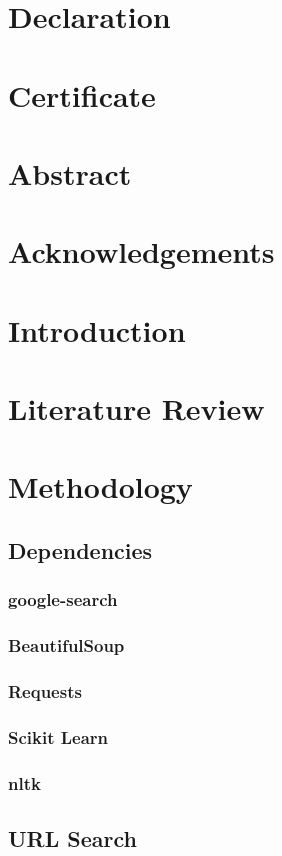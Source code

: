 \documentclass[a4paper,12pt]{article}
\begin{document}
	\pagebreak
	\section*{Declaration}
	\section*{Certificate}
	\section*{Abstract}
	\section*{Acknowledgements}
	\tableofcontents
	\section{Introduction}
	\section{Literature Review}
	\section{Methodology}
		\subsection{Dependencies}
			\subsubsection{google-search}
			\subsubsection{BeautifulSoup}
			\subsubsection{Requests}
			\subsubsection{Scikit Learn}
			\subsubsection{nltk}
		\subsection{URL Search}
\end{document}

